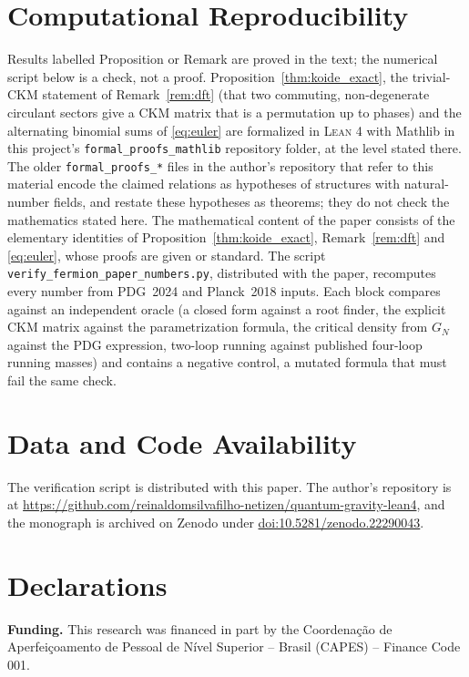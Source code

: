 \documentclass[11pt,reqno]{amsart}
\theoremstyle{definition}
\begin{document}
\section*{Computational Reproducibility}
Results labelled Proposition or Remark are proved in the text; the numerical script below is a check, not a proof. Proposition~\ref{thm:koide_exact}, the trivial-CKM statement of Remark~\ref{rem:dft} (that two commuting, non-degenerate circulant sectors give a CKM matrix that is a permutation up to phases) and the alternating binomial sums of \eqref{eq:euler} are formalized in \textsc{Lean 4} with Mathlib in this project's \texttt{formal\_proofs\_mathlib} repository folder, at the level stated there. The older \texttt{formal\_proofs\_*} files in the author's repository that refer to this material encode the claimed relations as hypotheses of structures with natural-number fields, and restate these hypotheses as theorems; they do not check the mathematics stated here. The mathematical content of the paper consists of the elementary identities of Proposition~\ref{thm:koide_exact}, Remark~\ref{rem:dft} and \eqref{eq:euler}, whose proofs are given or standard. The script \texttt{verify\_fermion\_paper\_numbers.py}, distributed with the paper, recomputes every number from PDG~2024 and Planck~2018 inputs. Each block compares against an independent oracle (a closed form against a root finder, the explicit CKM matrix against the parametrization formula, the critical density from $G_N$ against the PDG expression, two-loop running against published four-loop running masses) and contains a negative control, a mutated formula that must fail the same check.

\section*{Data and Code Availability}
The verification script is distributed with this paper. The author's repository is at \url{https://github.com/reinaldomsilvafilho-netizen/quantum-gravity-lean4}, and the monograph \cite{silvafilho2026book} is archived on Zenodo under \href{https://doi.org/10.5281/zenodo.22290043}{doi:10.5281/zenodo.22290043}.

\section*{Declarations}
\noindent\textbf{Funding.} This research was financed in part by the
Coordena\c{c}\~ao de Aperfei\c{c}oamento de Pessoal de N\'ivel Superior -- Brasil
(CAPES) -- Finance Code 001.
\end{document}
